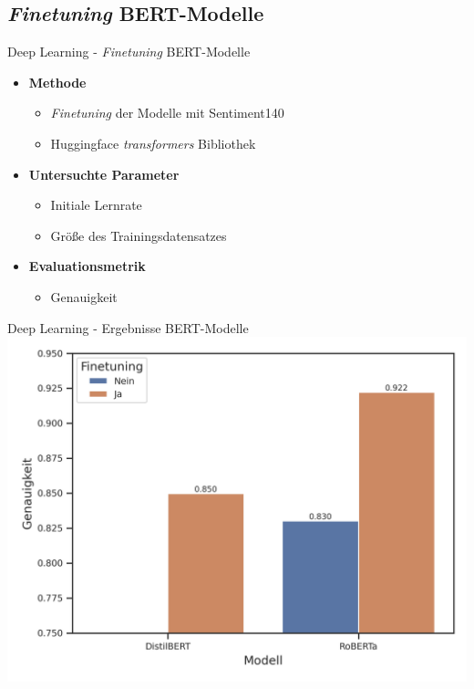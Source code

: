 \documentclass[aspectratio=169]{beamer}
\begin{document}
\subsection{\textit{Finetuning} BERT-Modelle}

\begin{frame}{Deep Learning - \textit{Finetuning} BERT-Modelle}
	\begin{itemize}
		\item \textbf{Methode}
		      \begin{itemize}
			      \item \textit{Finetuning} der Modelle mit Sentiment140
			      \item Huggingface \textit{transformers} Bibliothek
		      \end{itemize}
		\item \textbf{Untersuchte Parameter}
		      \begin{itemize}
			      \item Initiale Lernrate
			      \item Größe des Trainingsdatensatzes
		      \end{itemize}
		\item \textbf{Evaluationsmetrik}
		      \begin{itemize}
			      \item Genauigkeit
		      \end{itemize}
	\end{itemize}
\end{frame}

\begin{frame}{Deep Learning - Ergebnisse BERT-Modelle}
	\centering
	\includegraphics[scale=0.65]{../datasets/sentiment140/results/plots/bert-based-genauigkeit-bert-basierte-modelle-default-vs.-finetuning-truncated-y-axis.png}
\end{frame}
\end{document}
